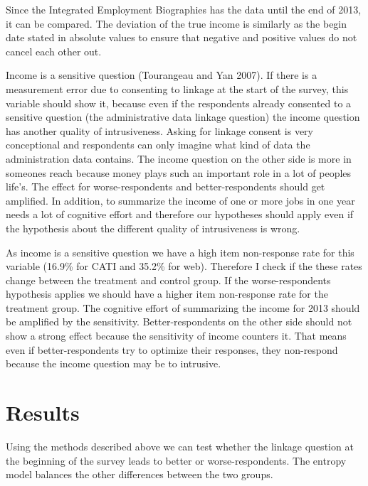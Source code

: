 Since the Integrated Employment Biographies has the data until the end of 2013, it can be compared. The deviation of the true income is similarly as the begin date stated in absolute values to ensure that negative and positive values do not cancel each other out.

Income is a sensitive question (Tourangeau and Yan 2007). If there is a measurement error due to consenting to linkage at the start of the survey, this variable should show it, because even if the respondents already consented to a sensitive question (the administrative data linkage question) the income question has another quality of intrusiveness. Asking for linkage consent is very conceptional and respondents can only imagine what kind of data the administration data contains. The income question on the other side is more in someones reach because money plays such an important role in a lot of peoples life's. The effect for worse-respondents and better-respondents should get amplified. In addition, to summarize the income of one or more jobs in one year needs a lot of cognitive effort and therefore our hypotheses should apply even if the hypothesis about the different quality of intrusiveness is wrong. 

As income is a sensitive question we have a high item non-response rate for this variable (16.9\% for CATI and 35.2\% for web). Therefore I check if the these rates change between the treatment and control group. If the worse-respondents hypothesis applies we should have a higher item non-response rate for the treatment group. The cognitive effort of summarizing the income for 2013 should be amplified by the sensitivity. Better-respondents on the other side should not show a strong effect because the sensitivity of income counters it. That means even if better-respondents try to optimize their responses, they non-respond because the income question may be to intrusive.

      























\section{Results}
Using the methods described above we can test whether the linkage question at the beginning of the survey leads to better or worse-respondents. The entropy model balances the other differences between the two groups. 


